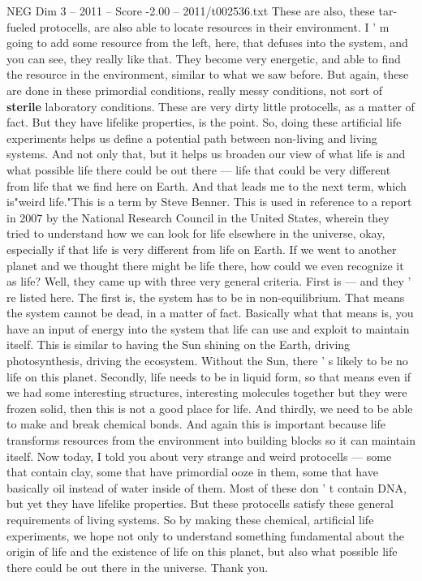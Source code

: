 \begin{textsample}{NEG Dim 3 – 2011 – Score -2.00 – 2011/t002536.txt}
These are also, these tar-fueled protocells, are also able to locate resources in their environment.
I ' m going to add some resource from the left, here, that defuses into the system, and you can see, they really like that.
They become very energetic, and able to find the resource in the environment, similar to what we saw before.
But again, these are done in these primordial conditions, really messy conditions, not sort of \textbf{sterile} laboratory conditions.
These are very dirty little protocells, as a matter of fact.
But they have lifelike properties, is the point.
So, doing these artificial life experiments helps us define a potential path between non-living and living systems.
And not only that, but it helps us broaden our view of what life is and what possible life there could be out there — life that could be very different from life that we find here on Earth.
And that leads me to the next term, which is"weird life."This is a term by Steve Benner.
This is used in reference to a report in 2007 by the National Research Council in the United States, wherein they tried to understand how we can look for life elsewhere in the universe, okay, especially if that life is very different from life on Earth.
If we went to another planet and we thought there might be life there, how could we even recognize it as life?
Well, they came up with three very general criteria.
First is — and they ' re listed here.
The first is, the system has to be in non-equilibrium.
That means the system cannot be dead, in a matter of fact.
Basically what that means is, you have an input of energy into the system that life can use and exploit to maintain itself.
This is similar to having the Sun shining on the Earth, driving photosynthesis, driving the ecosystem.
Without the Sun, there ' s likely to be no life on this planet.
Secondly, life needs to be in liquid form, so that means even if we had some interesting structures, interesting molecules together but they were frozen solid, then this is not a good place for life.
And thirdly, we need to be able to make and break chemical bonds.
And again this is important because life transforms resources from the environment into building blocks so it can maintain itself.
Now today, I told you about very strange and weird protocells — some that contain clay, some that have primordial ooze in them, some that have basically oil instead of water inside of them.
Most of these don ' t contain DNA, but yet they have lifelike properties.
But these protocells satisfy these general requirements of living systems.
So by making these chemical, artificial life experiments, we hope not only to understand something fundamental about the origin of life and the existence of life on this planet, but also what possible life there could be out there in the universe.
Thank you.

\end{textsample}
